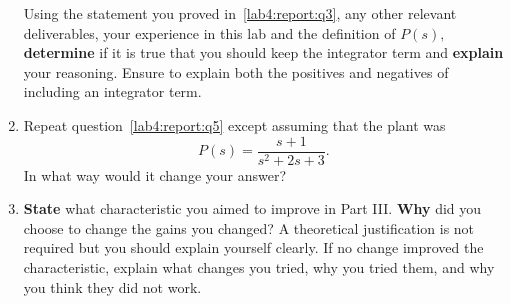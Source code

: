 \begin{deliverable}[label={lab4:report}]
\begin{enumerate}[label={(\arabic*)}]
{      Using the statement you proved in~\ref{lab4:report:q3}, any other relevant deliverables, your experience in this lab and the definition of \(P(s),\) \textbf{determine} if it is true that you should keep the integrator term and \textbf{explain} your reasoning. Ensure to explain both the positives and negatives of including an integrator term.
      \label{lab4:report:q5}
    }
    \item{%
      Repeat question~\ref{lab4:report:q5} except assuming that the plant was
      \[
        P(s) = \frac{s + 1}{s^2 + 2 s + 3}.
      \]
      In what way would it change your answer?
      \label{lab4:report:q6}
    }
    \item{%
      \textbf{State} what characteristic you aimed to improve in Part III.
      \textbf{Why} did you choose to change the gains you changed?
      A theoretical justification is not required but you should explain yourself clearly.
      If no change improved the characteristic, explain what changes you tried, why you tried them, and why you think they did not work.
      \label{lab4:report:q7}
    }
  \end{enumerate}
\end{deliverable}

